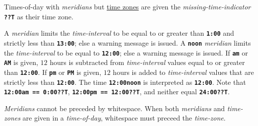 \documentclass[12pt]{article}
\newcommand{\TT}[1]{{\tt \bfseries #1}}
\begin{document}
Times-of-day with {\em meridians} but \underline{time zones}
are given the {\em missing-time-indicator} \TT{??T} as their
time zone.

A {\em meridian} limits the {\em time-interval}
to be equal to or greater than \TT{1:00} and strictly less than
\TT{13:00}; else a warning message is issued.  A \TT{noon}
{\em meridian} limits the {\em time-interval}
to be equal to \TT{12:00}; else a warning message is issued.
If \TT{am} or \TT{AM} is given, $12$ hours is subtracted from
{\em time-interval} values equal to or greater than \TT{12:00}.
If \TT{pm} or \TT{PM} is given, $12$ hours is added to
{\em time-interval} values that are strictly less than \TT{12:00}.
The time \TT{12:00noon} is interpreted as \TT{12:00}.
Note that \TT{12:00am == 0:00??T}, \TT{12:00pm == 12:00??T}, and neither
equal \TT{24:00??T}.

{\em Meridians} cannot be preceded by whitespace.
When both {\em meridians} and {\em time-zones} are given
in a {\em time-of-day}, whitespace must preceed the {\em time-zone}.
\end{document}
